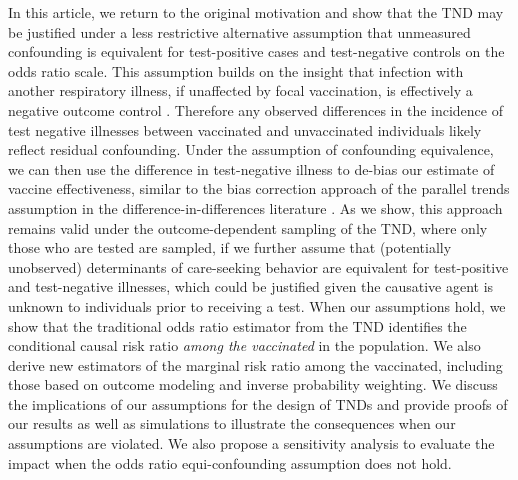 \documentclass[11pt]{article}
\begin{document}
In this article, we return to the original motivation and show that the TND may be justified under a less restrictive alternative assumption that unmeasured confounding is equivalent for test-positive cases and test-negative controls on the odds ratio scale. This assumption builds on the insight that infection with another respiratory illness, if unaffected by focal vaccination, is effectively a negative outcome control \cite{lipsitch_negative_2010,shi_selective_2020}. Therefore any observed differences in the incidence of test negative illnesses between vaccinated and unvaccinated individuals likely reflect residual confounding. Under the  assumption of confounding equivalence, we can then use the difference in test-negative illness to de-bias our estimate of vaccine effectiveness, similar to the bias correction approach of the parallel trends assumption in the difference-in-differences literature \cite{sofer_negative_2016,park_universal_2023,tchetgen_universal_2023}. As we show, this approach remains valid under the outcome-dependent sampling of the TND, where only those who are tested are sampled, if we further assume that (potentially unobserved) determinants of care-seeking behavior are equivalent for test-positive and test-negative illnesses, which could be justified given the causative agent is unknown to individuals prior to receiving a test.  When our assumptions hold, we show that the traditional odds ratio estimator from the TND identifies the conditional causal risk ratio \textit{among the vaccinated} in the population. We also derive new estimators of the marginal risk ratio among the vaccinated, including those based on outcome modeling and inverse probability weighting. We discuss the implications of our assumptions for the design of TNDs and provide proofs of our results as well as simulations to illustrate the consequences when our assumptions are violated. We also propose a sensitivity analysis to evaluate the impact when the odds ratio equi-confounding assumption does not hold.
\end{document}
